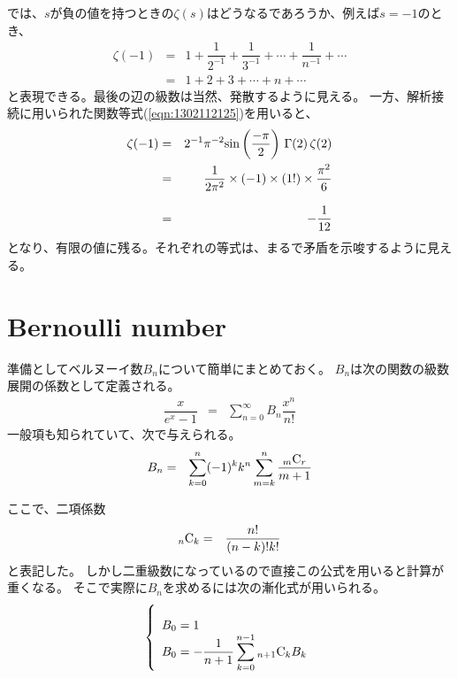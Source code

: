 \documentclass[uplatex,a4j,12pt,dvipdfmx]{jsarticle}
\begin{document}
では、$s$が負の値を持つときの$\zeta(s)$はどうなるであろうか、例えば$s=-1$のとき、
\begin{eqnarray}
	\zeta(-1)
	&=&
	1
	+
	\dfrac{1}{2^{-1}}
	+
	\dfrac{1}{3^{-1}}
	+
	\cdots
	+
	\dfrac{1}{n^{-1}}
	+
	\cdots
	\nonumber \\[3mm] &=&
	1+2+3+\cdots+n+\cdots
\end{eqnarray}
と表現できる。最後の辺の級数は当然、発散するように見える。
一方、解析接続に用いられた関数等式(\ref{eqn:1302112125})を用いると、
\begin{eqnarray}
	\zeta(-1)
	&=&
	2^{-1}
	\pi^{-2}
	{\rm sin}
	\left(
	\frac{- \pi}{2}
	\right)
	\ \!
	\Gamma(2)
	\ \!
	\zeta(2)
	\nonumber \\ &=&
	\frac{1}{2 \pi^{2}}
	\times
	(-1)
	\times
	(1!)
	\times
	\frac{\pi^{2}}{6}
	\nonumber \\[3mm] &=&
	- \frac{1}{12}
\end{eqnarray}
となり、有限の値に残る。それぞれの等式は、まるで矛盾を示唆するように見える。

\section{Bernoulli number}

準備としてベルヌーイ数$B_{n}$について簡単にまとめておく。
$B_{n}$は次の関数の級数展開の係数として定義される。
\begin{eqnarray}
	\dfrac{x}{e^{x}-1}
	&=&
	\sum_{n=0}^{\infty}
	B_{n}
	\dfrac{x^{n}}{n!}
\end{eqnarray}
一般項も知られていて、次で与えられる。
\begin{eqnarray}
	B_{n}
	&=&
	\sum_{k=0}^{n}
	(-1)^{k}
	k^{n}
	\sum_{m=k}^{n}
	\dfrac{{_{m}}{\rm C}_{r}}{m+1}
\end{eqnarray}




ここで、二項係数
\begin{eqnarray}
	{_{n}}{\rm C}_{k}
	&=&
	\dfrac{n!}{(n-k)!k!}
\end{eqnarray}
と表記した。
しかし二重級数になっているので直接この公式を用いると計算が重くなる。
そこで実際に$B_{n}$を求めるには次の漸化式が用いられる。
\begin{eqnarray}
	\left\{
	\begin{array}{l}
		\\
		B_{0} = 1 \\
		B_{0} = -\dfrac{1}{n+1} \displaystyle \sum_{k=0}^{n-1} {_{n+1}}{\rm C}_{k} B_{k}
	\end{array}
	\right.
\end{eqnarray}
\end{document}
